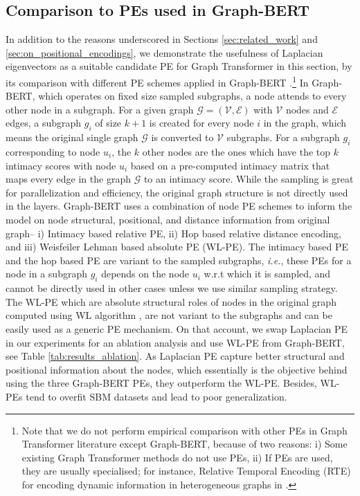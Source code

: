 \documentclass[letterpaper]{article}
\begin{document}
\subsection{Comparison to PEs used in Graph-BERT}
In addition to the
reasons underscored in Sections \ref{sec:related_work} and \ref{sec:on_positional_encodings}, we demonstrate the usefulness of Laplacian eigenvectors as a suitable candidate PE for Graph Transformer in this section, by its comparison with different PE schemes applied in Graph-BERT \cite{zhang2020graph}.\footnote{Note that we do not perform empirical comparison with other PEs in Graph Transformer literature except Graph-BERT, because of two reasons: i) Some existing Graph Transformer methods do not use PEs, ii) If PEs are used, they are usually specialised; for instance, Relative Temporal Encoding (RTE) for encoding dynamic information in heterogeneous graphs in \cite{hu2020heterogeneous}.} In Graph-BERT, which operates on fixed size sampled subgraphs, a node attends to every other node in a subgraph.
For a given graph $\mathcal{G}=(\mathcal{V},\mathcal{E})$ with $\mathcal{V}$ nodes and $\mathcal{E}$ edges, a subgraph $g_i$ of size $k+1$ is created for every node $i$ in the graph, which means the original single graph $\mathcal{G}$ is converted to $\mathcal{V}$ subgraphs. For a subgraph $g_i$ corresponding to node $u_i$, the $k$ other nodes are the ones which have the top $k$ intimacy scores with node $u_i$ based on a pre-computed intimacy matrix that maps every edge in the graph $\mathcal{G}$ to an intimacy score.
While the sampling is great for parallelization and efficiency, the original graph structure is not directly used in the layers. Graph-BERT uses a combination of node PE schemes to inform the model on node structural, positional, and distance information from original graph-- i) Intimacy based relative PE, ii) Hop based relative distance encoding, and iii) Weisfeiler Lehman based absolute PE (WL-PE). The intimacy based PE and the hop based PE are variant to the sampled subgraphs, \textit{i.e.}, these PEs for a node in a subgraph $g_i$ depends on the node $u_i$ w.r.t which it is sampled, and cannot be directly used in other cases unless we use similar sampling strategy. The WL-PE which are absolute structural roles of nodes in the original graph computed using WL algorithm \cite{zhang2020graph, niepert2016learning}, are not variant to the subgraphs and can be easily used as a generic PE mechanism. On that account, we swap Laplacian PE in our experiments for an ablation analysis and use WL-PE from Graph-BERT, see Table \ref{tab:results_ablation}.
As Laplacian PE capture better structural and positional information about the nodes, which essentially is the objective behind using the three Graph-BERT PEs, they outperform the WL-PE. Besides, WL-PEs tend to overfit SBM datasets and lead to poor generalization.
\end{document}
